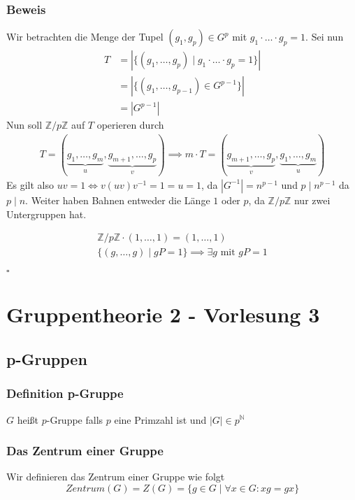 \documentclass[12pt, german]{article}
\newcommand{\bewiesen}{

\begin{flushright}
		$\square$  \\
\end{flushright}}
\begin{document}
\subsubsection{Beweis}
	Wir betrachten die Menge der Tupel $(g_1, g_p) \in G^p$ mit $g_1 \cdot \ldots \cdot g_p = 1$. 
	Sei nun 
	\begin{align*}
		T &= |\{(g_1, \ldots, g_p) \mid  g_1 \cdot \ldots \cdot g_p = 1 \}| \\
		&= |\{(g_1, \ldots, g_{p-1}) \in G^{p-1} \}| \\
		&= |G^{p-1}|
	\end{align*}
	Nun soll $\mathbb Z /p\mathbb Z$ auf $T$ operieren durch
	 \begin{align*}
		T = (\underbrace{g_1, \ldots, g_m}_{\substack{u}}, \underbrace{g_{m+1}, \ldots, g_p}_{\substack{v}}) \implies m\cdot T = (\underbrace{g_{m+1}, \ldots, g_p}_{\substack{v}}, \underbrace{g_1, \ldots, g_m}_{\substack{u}})
	\end{align*}
	Es gilt also $uv = 1 \iff v(uv)v^{-1} = 1 = u = 1$, da $|G^{-1}| = n^{p-1}$ und $p \mid n^{p-1} $ da $p \mid n$.
	Weiter haben Bahnen entweder die Länge $1$ oder $p$, da $\mathbb Z /p\mathbb Z$ nur zwei Untergruppen hat.

	\begin{align*}
		\mathbb Z /p\mathbb Z \cdot (1, \ldots, 1) = (1, \ldots, 1) \\
		\{(g, \ldots, g) \mid gP= 1 \} \implies \exists g \text{ mit } gP = 1
	\end{align*}
\bewiesen

\section{Gruppentheorie 2 - Vorlesung 3}
\subsection{p-Gruppen}
\subsubsection{Definition p-Gruppe}
	$G$ heißt $p$-Gruppe falls $p$ eine Primzahl ist und $|G| \in p^{\mathbb N}$

\subsubsection{Das Zentrum einer Gruppe}
	Wir definieren das Zentrum einer Gruppe wie folgt $$Zentrum(G)= Z(G) = \{g \in G \mid  \forall x \in G: xg = gx\}$$
\end{document}
